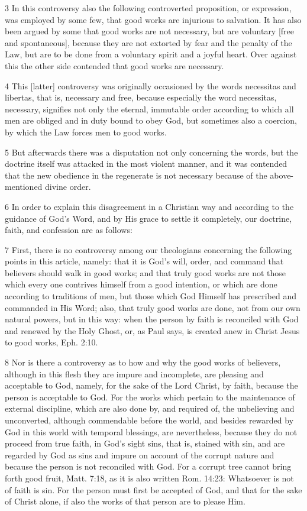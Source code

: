 3 In this controversy also the following controverted proposition, or expression, was employed by some few, that good works are injurious to salvation. It has also been argued by some that good works are not necessary, but are voluntary [free and spontaneous], because they are not extorted by fear and the penalty of the Law, but are to be done from a voluntary spirit and a joyful heart. Over against this the other side contended that good works are necessary.

4 This [latter] controversy was originally occasioned by the words necessitas and libertas, that is, necessary and free, because especially the word necessitas, necessary, signifies not only the eternal, immutable order according to which all men are obliged and in duty bound to obey God, but sometimes also a coercion, by which the Law forces men to good works.

5 But afterwards there was a disputation not only concerning the words, but the doctrine itself was attacked in the most violent manner, and it was contended that the new obedience in the regenerate is not necessary because of the above-mentioned divine order.

6 In order to explain this disagreement in a Christian way and according to the guidance of God’s Word, and by His grace to settle it completely, our doctrine, faith, and confession are as follows:

7 First, there is no controversy among our theologians concerning the following points in this article, namely: that it is God’s will, order, and command that believers should walk in good works; and that truly good works are not those which every one contrives himself from a good intention, or which are done according to traditions of men, but those which God Himself has prescribed and commanded in His Word; also, that truly good works are done, not from our own natural powers, but in this way: when the person by faith is reconciled with God and renewed by the Holy Ghost, or, as Paul says, is created anew in Christ Jesus to good works, Eph. 2:10.

8 Nor is there a controversy as to how and why the good works of believers, although in this flesh they are impure and incomplete, are pleasing and acceptable to God, namely, for the sake of the Lord Christ, by faith, because the person is acceptable to God. For the works which pertain to the maintenance of external discipline, which are also done by, and required of, the unbelieving and unconverted, although commendable before the world, and besides rewarded by God in this world with temporal blessings, are nevertheless, because they do not proceed from true faith, in God’s sight sins, that is, stained with sin, and are regarded by God as sins and impure on account of the corrupt nature and because the person is not reconciled with God. For a corrupt tree cannot bring forth good fruit, Matt. 7:18, as it is also written Rom. 14:23: Whatsoever is not of faith is sin. For the person must first be accepted of God, and that for the sake of Christ alone, if also the works of that person are to please Him.

